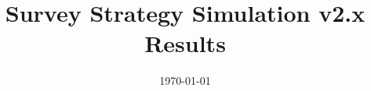 \documentclass[modern]{aastex62}
\begin{document}

\date{\today}
\title{Survey Strategy Simulation v2.x Results}









\end{document}
